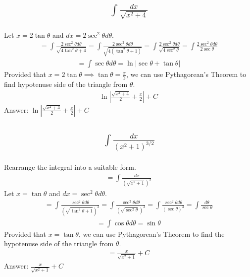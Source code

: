 \documentclass{article}
\begin{document}
\subsection{
	\begin{align*}
		\int{\frac{dx}{\sqrt{x^2 + 4}}}
	\end{align*}
}
Let $x = 2\tan{\theta}$ and $dx = 2\sec^2{\theta}d\theta$. 
\begin{align*}
	= \int{\frac{2\sec^2{\theta}d\theta}{\sqrt{4\tan^2{\theta} + 4}}} = \int{\frac{2\sec^2{\theta}d\theta}{\sqrt{4(\tan^2{\theta} + 1)}}} = \int{\frac{2\sec^2{\theta}d\theta}{\sqrt{4\sec^2{\theta}}}} = \int{\frac{2\sec^2{\theta}d\theta}{2\sec{\theta}}} 
\end{align*}
\begin{align*}
	= \int{\sec{\theta} d\theta} = \ln{|\sec{\theta} + \tan{\theta}|}
\end{align*}
Provided that $x = 2\tan{\theta} \implies \tan{\theta} = \frac{x}{2}$, we can use Pythagorean's Theorem to find hypotenuse side of the triangle from $\theta$. 
\begin{align*}
	\ln{|\frac{\sqrt{x^2 + 4}}{2} + \frac{x}{2}|} + C
\end{align*}
Answer: $\ln{| \frac{\sqrt{x^2 + 4}}{2} + \frac{x}{2}|}  + C$

\subsection{
	\begin{align*}
		\int{\frac{dx}{(x^2 + 1)^{3/2}}}
	\end{align*}
}
Rearrange the integral into a suitable form.
\begin{align*}
	= \int{\frac{dx}{(\sqrt{x^2 + 1})^3}}
\end{align*}
Let $x = \tan{\theta}$ and $dx = \sec^2{\theta}d\theta$.
\begin{align*}
	= \int{\frac{\sec^2{\theta}d\theta}{(\sqrt{\tan^2{\theta} + 1})^3}} = \int{\frac{\sec^2{\theta}d\theta}{(\sqrt{\sec^2{\theta}})^3}} = \int{\frac{\sec^2{\theta}d\theta}{(\sec{\theta})^3}} = \int{\frac{d\theta}{\sec{\theta}}}
\end{align*}
\begin{align*}
	= \int{\cos{\theta}d\theta} = \sin{\theta}
\end{align*}
Provided that $x = \tan{\theta}$, we can use Pythagorean's Theorem to find the hypotenuse side of the triangle from $\theta$. 
\begin{align*}
	= \frac{x}{\sqrt{x^2 + 1}} + C
\end{align*}
Answer: $\frac{x}{\sqrt{x^2 + 1}} + C$
\end{document}
